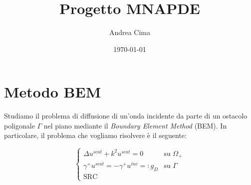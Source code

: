 \documentclass[a4paper,12pt]{article}
\title{
    \textbf{Progetto MNAPDE}
}
\author{
    Andrea Cima
}
\date{\today}
\theoremstyle{definition}
\begin{document}
\maketitle

\tableofcontents

\newpage

\section{Metodo BEM}
\label{sec:BEM_base}
Studiamo il problema di diffusione di un'onda incidente da parte di un ostacolo poligonale $\Gamma$ nel piano mediante il \textit{Boundary Element Method} (BEM). In particolare, il problema che vogliamo risolvere è il seguente:\\
\vspace{0.7cm}
\begin{minipage}{0.3\textwidth}
\centering
{}
\end{minipage}
\hfill
\begin{minipage}{0.55\textwidth}
\begin{equation}
\label{eq:edp}
\begin{cases}
\Delta u^{scat} + k^2u^{scat} = 0 & \text{su } \Omega_+\\
\gamma^+u^{scat} = -\gamma^+ u^{inc} =: g_D & \text{su } \Gamma\\
\text{SRC}
\end{cases}
\end{equation}
\end{minipage}
\end{document}
